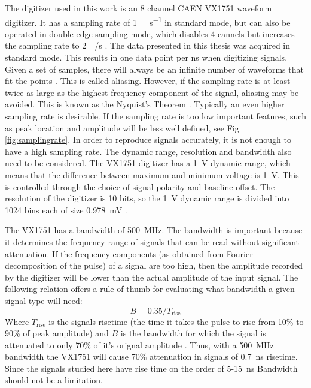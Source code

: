 \documentclass[main.tex]{subfiles}
\begin{document}
The digitizer used in this work is an 8 channel CAEN VX1751 waveform digitizer. It has a sampling rate of \si{1\giga\sample\per\second} in standard mode, but can also be operated in double-edge sampling mode, which disables 4 cannels but increases the sampling rate to \SI{2}{\giga\sample/\second} \cite{CAEN}. The data presented in this thesis was acquired in standard mode. This results in one data point per ns when digitizing signals. Given a set of samples, there will always be an infinite number of waveforms that fit the points \cite{Spectrum}. This is called aliasing. However, if the sampling rate is at least twice as large as the highest frequency component of the signal, aliasing may be avoided. This is known as the Nyquist's Theorem \cite{Spectrum}. Typically an even higher sampling rate is desirable. If the sampling rate is too low important features, such as peak location and amplitude will be less well defined, see Fig \ref{fig:samplingrate}.
In order to reproduce signals accurately, it is not enough to have a high sampling rate. The dynamic range, resolution and bandwidth also need to be considered. 
The VX1751 digitizer has a \SI{1}{\volt} dynamic range, which means that the difference between maximum and minimum voltage is \SI{1}{\volt}. This is controlled through the choice of signal polarity and baseline offset. The resolution of the digitizer is 10 bits, so the \si{1\volt} dynamic range is divided into 1024 bins each of size \SI{0.978}{\milli\volt} \cite{CAEN}.

The VX1751 has a bandwidth of \SI{500}{\mega\hertz}. The bandwidth is important because it determines the frequency range of signals that can be read without significant attenuation. If the frequency components (as obtained from Fourier decomposition of the pulse) of a signal are too high, then the amplitude recorded by the digitizer will be lower than the actual amplitude of the input signal. The following relation offers a rule of thumb for evaluating what bandwidth a given signal type will need:
\begin{equation}
\label{eq:bandwidth}
B=0.35/T_{\textrm{rise}}
\end{equation}
Where $T_\textrm{rise}$ is the signals risetime (the time it takes the pulse to rise from 10\% to 90\% of peak amplitude) and $B$ is the bandwidth for which the signal is attenuated to only 70\% of it's orignal amplitude \cite{Leo}. Thus, with a \SI{500}{MHz} bandwidth the VX1751 will cause 70\% attenuation in signals of \SI{0.7}{ns} risetime. Since the signals studied here have rise time on the order of 5-\SI{15}{ns} Bandwidth should not be a limitation.
\end{document}
